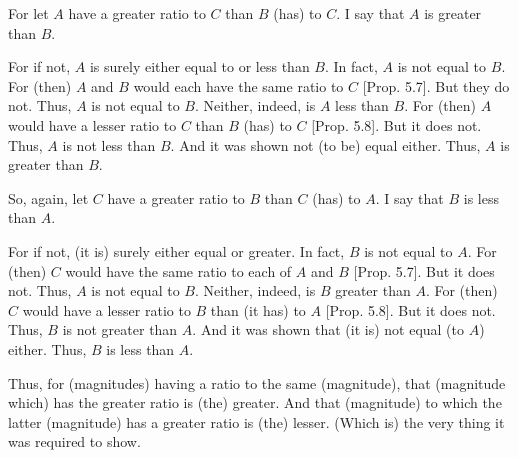 \begin{Parallel}{}{}
{\epsfysize=0.5in
\centerline{}

For let $A$ have a greater ratio to $C$ than $B$ (has) to $C$. I say that $A$ is greater than $B$.

For if not, $A$ is surely either equal to or less than $B$. In fact, $A$ is not
equal to $B$. For (then) $A$ and $B$ would each have the same ratio to $C$ 
 [Prop. 5.7]. But they do not. Thus, $A$
 is not equal to $B$. Neither, indeed, is $A$ less than $B$. For (then)
 $A$ would have a lesser ratio to $C$ than $B$ (has) to $C$ [Prop. 5.8]. But it does not. Thus, $A$ is not less
 than $B$. And it was shown not (to be) equal either. Thus, $A$ is greater than $B$.
 
 So, again, let $C$ have a greater ratio to $B$ than $C$ (has) to $A$. I say that
 $B$ is less than $A$.
 
 For if not, (it is) surely either equal or greater. In fact, $B$ is not equal to 
 $A$. For (then) $C$ would have the same ratio to each of $A$ and $B$  [Prop. 5.7]. But it does not. Thus, $A$ is not equal to $B$. 
 Neither, indeed, is $B$ greater than $A$. For (then) $C$ would have a lesser
 ratio to $B$ than (it has) to $A$ [Prop. 5.8].
 But it does not. Thus, $B$ is not greater than $A$. And it was shown that
  (it is) not equal (to $A$) either. Thus, $B$ is less than $A$.
  
 Thus, for (magnitudes) having a ratio to the same (magnitude), that (magnitude which)
 has the greater  ratio is (the) greater. And that (magnitude) to which the latter (magnitude) has a greater ratio is (the)
lesser. (Which is) the very thing it was required to show.}
\end{Parallel}

